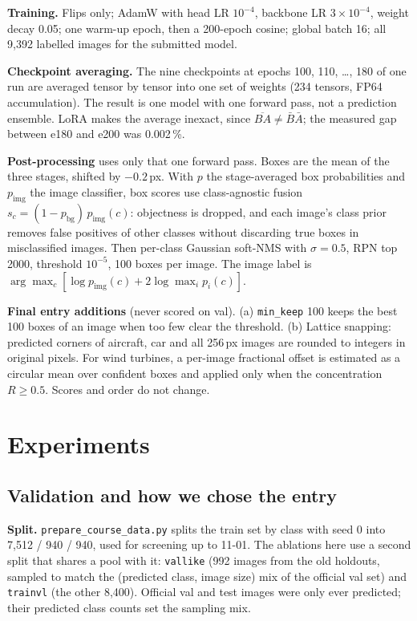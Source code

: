 \documentclass[10pt,twocolumn,letterpaper]{article}
\begin{document}
\textbf{Training.} Flips only; AdamW with head LR $10^{-4}$, backbone LR $3{\times}10^{-4}$, weight decay 0.05; one warm-up epoch, then a 200-epoch cosine; global batch 16; all 9,392 labelled images for the submitted model.

\textbf{Checkpoint averaging.} The nine checkpoints at epochs 100, 110, \dots, 180 of one run are averaged tensor by tensor into one set of weights (234 tensors, FP64 accumulation). The result is one model with one forward pass, not a prediction ensemble. LoRA makes the average inexact, since $\overline{BA}\neq\bar B\bar A$; the measured gap between e180 and e200 was 0.002\,\%.

\textbf{Post-processing} uses only that one forward pass. Boxes are the mean of the three stages, shifted by $-0.2$\,px. With $p$ the stage-averaged box probabilities and $p_{\text{img}}$ the image classifier, box scores use class-agnostic fusion $s_c=(1-p_{\text{bg}})\,p_{\text{img}}(c)$: objectness is dropped, and each image's class prior removes false positives of other classes without discarding true boxes in misclassified images. Then per-class Gaussian soft-NMS with $\sigma{=}0.5$, RPN top 2000, threshold $10^{-5}$, 100 boxes per image. The image label is $\arg\max_c[\log p_{\text{img}}(c)+2\log\max_i p_i(c)]$.

\textbf{Final entry additions} (never scored on val). (a) \texttt{min\_keep} 100 keeps the best 100 boxes of an image when too few clear the threshold. (b) Lattice snapping: predicted corners of aircraft, car and all 256\,px images are rounded to integers in original pixels. For wind turbines, a per-image fractional offset is estimated as a circular mean over confident boxes and applied only when the concentration $R\ge0.5$. Scores and order do not change.

\section{Experiments}
\subsection{Validation and how we chose the entry}
\label{sec:val}
\textbf{Split.} \texttt{prepare\_course\_data.py} splits the train set by class with seed 0 into 7,512 / 940 / 940, used for screening up to 11-01. The ablations here use a second split that shares a pool with it: \texttt{vallike} (992 images from the old holdouts, sampled to match the (predicted class, image size) mix of the official val set) and \texttt{trainvl} (the other 8,400). Official val and test images were only ever predicted; their predicted class counts set the sampling mix.
\end{document}
